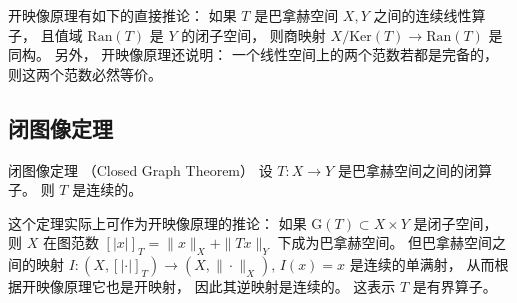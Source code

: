 开映像原理有如下的直接推论： 如果 $T$ 是巴拿赫空间 $X,Y$ 之间的连续线性算子， 且值域 $\text{Ran}(T)$ 是 $Y$ 的闭子空间， 则商映射 $X/\text{Ker}(T)\to \text{Ran}(T)$ 是同构。 另外， 开映像原理还说明： 一个线性空间上的两个范数若都是完备的， 则这两个范数必然等价。

\subsection{闭图像定理}
\begin{theorem}{闭图像定理 （Closed Graph Theorem）}
设 $T:X\to Y$ 是巴拿赫空间之间的闭算子。 则 $T$ 是连续的。
\end{theorem}
这个定理实际上可作为开映像原理的推论： 如果 $\text{G}(T)\subset X\times Y$ 是闭子空间， 则 $X$ 在图范数 $[|x|]_T=\|x\|_X+\|Tx\|_Y$ 下成为巴拿赫空间。 但巴拿赫空间之间的映射 $I:(X,[|\cdot|]_T)\to(X,\|\cdot\|_X),\,I(x)=x$ 是连续的单满射， 从而根据开映像原理它也是开映射， 因此其逆映射是连续的。 这表示 $T$ 是有界算子。
